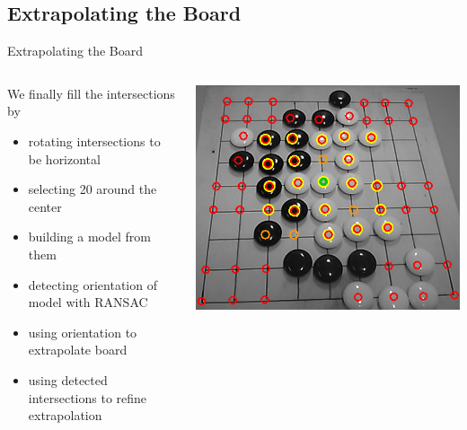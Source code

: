 \documentclass[table]{beamer}
\begin{document}

\subsection{Extrapolating the Board}
\begin{frame}{Extrapolating the Board}
	\begin{columns}
		\begin{column}{0.6\textwidth}
			We finally fill the intersections by
			\begin{itemize}
				\item rotating intersections to be horizontal
				\item selecting 20 around the center
				\item building a model from them
				\item detecting orientation of model with RANSAC
				\item using orientation to extrapolate board
				\item using detected intersections to refine extrapolation
			\end{itemize}
		\end{column}
		\begin{column}{0.3\textwidth}
			\includegraphics[width=\columnwidth]{images/buildingModel.png}\\

\end{column}
\end{columns}
\end{frame}
\end{document}
